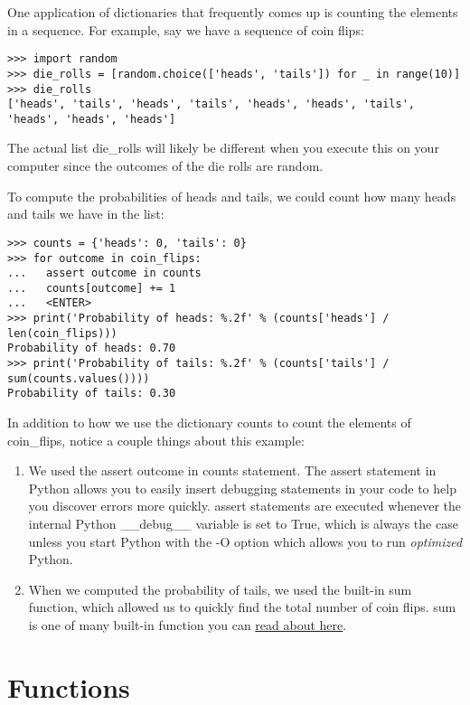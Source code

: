 One application of dictionaries that frequently comes up is counting the
elements in a sequence. For example, say we have a sequence of coin
flips:

\begin{verbatim}
>>> import random
>>> die_rolls = [random.choice(['heads', 'tails']) for _ in range(10)]
>>> die_rolls
['heads', 'tails', 'heads', 'tails', 'heads', 'heads', 'tails', 'heads', 'heads', 'heads']
\end{verbatim}

The actual list die\_rolls will likely be different when you execute
this on your computer since the outcomes of the die rolls are random.

To compute the probabilities of heads and tails, we could count how many
heads and tails we have in the list:

\begin{verbatim}
>>> counts = {'heads': 0, 'tails': 0}
>>> for outcome in coin_flips:
...   assert outcome in counts
...   counts[outcome] += 1
...   <ENTER>
>>> print('Probability of heads: %.2f' % (counts['heads'] / len(coin_flips)))
Probability of heads: 0.70
>>> print('Probability of tails: %.2f' % (counts['tails'] / sum(counts.values())))
Probability of tails: 0.30
\end{verbatim}

In addition to how we use the dictionary counts to count the elements of
coin\_flips, notice a couple things about this example:

\begin{enumerate}
\tightlist
\item
  We used the assert outcome in counts statement. The assert statement
  in Python allows you to easily insert debugging statements in your
  code to help you discover errors more quickly. assert statements are
  executed whenever the internal Python \_\_debug\_\_ variable is set to
  True, which is always the case unless you start Python with the -O
  option which allows you to run \emph{optimized} Python.
\item
  When we computed the probability of tails, we used the built-in sum
  function, which allowed us to quickly find the total number of coin
  flips. sum is one of many built-in function you can
  \href{https://docs.python.org/2/library/functions.html}{read about
  here}.
\end{enumerate}

\section{Functions}\label{functions}

